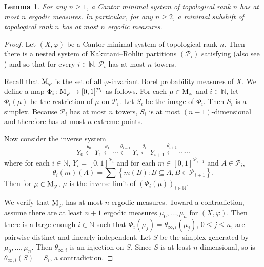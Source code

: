 \documentclass{amsart}
\newtheorem{lemma}[theorem]{Lemma}
\theoremstyle{definition}
\theoremstyle{problem}
\theoremstyle{remark}
\numberwithin{equation}{section}
\begin{document}
\begin{lemma}\label{lem:MSN} For any $n\geq 1$, a Cantor minimal system of topological rank $n$ has at most $n$ ergodic measures. In particular, for any $n\geq 2$, a minimal subshift of topological rank $n$ has at most $n$ ergodic measures.
\end{lemma}

\begin{proof}
Let $(X,\varphi)$ be a Cantor minimal system of topological rank $n$. Then there is a nested system of Kakutani--Rohlin partitions $(\mathcal{P}_i)$ satisfying   \cite[Theorem 4.2]{HPS} (also see \cite[Theorem 2.2]{GL}) and so that for every $i\in\mathbb{N}$, $\mathcal{P}_i$ has at most $n$ towers. 

Recall that $\mbox{\rm M}_\varphi$ is the set of all $\varphi$-invariant Borel probability measures of $X$. We define a map $\Phi_i\colon \mbox{\rm M}_\varphi\to [0,1]^{\mathcal{P}_i}$ as follows. For each $\mu\in\mbox{\rm M}_\varphi$ and $i\in\mathbb{N}$, let $\Phi_i(\mu)$ be the restriction of $\mu$ on $\mathcal{P}_i$. Let $S_i$ be  the image of $\Phi_i$. Then $S_i$ is a simplex. Because $\mathcal{P}_i$ has at most $n$ towers, $S_i$ is at most $(n-1)$-dimensional and therefore has at most $n$ extreme points.  

Now consider the inverse system
$$ Y_0\stackrel{\theta_0}{\longleftarrow} Y_1\stackrel{\theta_1}{\longleftarrow} \cdots \stackrel{\theta_{i-1}}{\longleftarrow}Y_i\stackrel{\theta_i}{\longleftarrow} Y_{i+1}\stackrel{\theta_{i+1}}{\longleftarrow}\cdots\cdots $$
where for each $i\in\mathbb{N}$, $Y_i=[0,1]^{\mathcal{P}_i}$ and for each $m\in [0,1]^{\mathcal{P}_{i+1}}$ and $A\in \mathcal{P}_i$,
$$ \theta_i(m)(A)=\displaystyle\sum\left\{ m(B)\colon B\subseteq A, B\in \mathcal{P}_{i+1}\right\}. $$
Then for $\mu\in \mbox{\rm M}_\varphi$, $\mu$ is the inverse limit of $(\Phi_i(\mu))_{i\in \mathbb{N}}$.

We verify that $\mbox{\rm M}_\varphi$ has at most $n$ ergodic measures. Toward a contradiction, assume there are at least $n+1$ ergodic measures $\mu_0, \dots, \mu_{n}$ for $(X, \varphi)$. Then there is a large enough $i\in\mathbb{N}$ such that $\Phi_i(\mu_j)=\theta_{\infty,i}(\mu_j)$, $0\leq j\leq n$, are pairwise distinct and linearly independent. Let $S$ be the simplex generated by $\mu_0, \dots, \mu_n$. Then $\theta_{\infty,i}$ is an injection on $S$. Since $S$ is at least $n$-dimensional, so is $\theta_{\infty,i}(S)=S_i$, a contradiction.
\end{proof}
\end{document}
